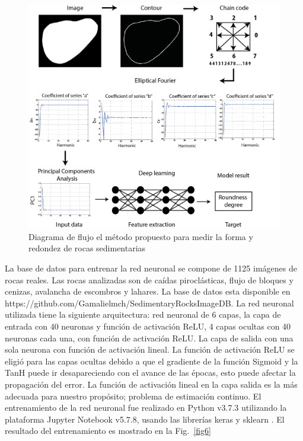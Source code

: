 \documentclass[conference]{IEEEtran}
\begin{document}
\begin{figure}[htbp]
\centerline{\includegraphics[scale=0.8]{fig5.png}}
\caption{Diagrama de flujo el método propuesto para medir la forma y redondez de rocas sedimentarias}
\label{fig5}
\end{figure}

La base de datos para entrenar la red neuronal se compone de 1125 imágenes de rocas reales. Las rocas analizadas son de caídas piroclásticas, flujo de bloques y cenizas, avalancha de escombros y lahares. La base de datos esta disponible en https://github.com/Gamalielmch/SedimentaryRocksImageDB. La red neuronal utilizada tiene la siguiente arquitectura: red  neuronal de 6 capas, la capa de entrada con 40 neuronas y función de activación ReLU, 4 capas ocultas con 40 neuronas cada una, con función de activación ReLU. La capa de salida con una sola neurona con función de activación lineal. La función de activación ReLU se eligió para las capas ocultas debido a que el gradiente de la función Sigmoid y la TanH puede ir desapareciendo con el avance de las épocas, esto puede afectar la propagación del error. La función de activación lineal en la capa salida es la más adecuada para nuestro propósito; problema de estimación continuo. El entrenamiento de la red neuronal fue realizado en Python v3.7.3 utilizando la plataforma Jupyter Notebook v5.7.8, usando las librerías keras y sklearn \cite{b13}. El resultado del entrenamiento es mostrado en la Fig.~\ref{fig6}
\end{document}
